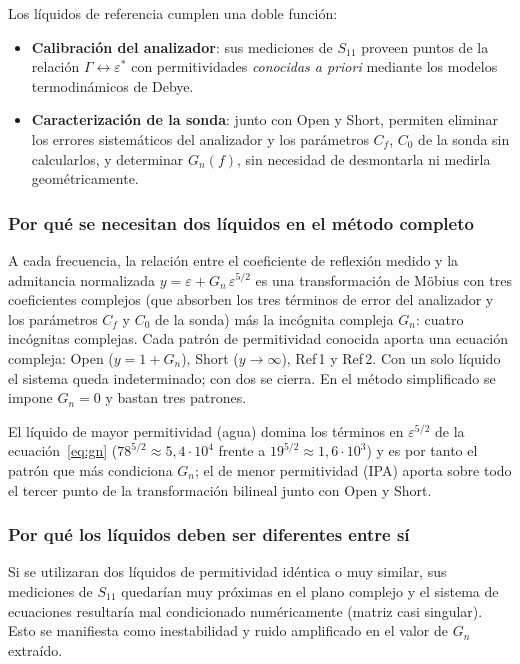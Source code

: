 Los líquidos de referencia cumplen una doble función:
\begin{itemize}
    \item \textbf{Calibración del analizador}: sus mediciones de $S_{11}$
          proveen puntos de la relación $\Gamma \leftrightarrow \varepsilon^*$
          con permitividades \emph{conocidas a priori} mediante los modelos
          termodinámicos de Debye.
    \item \textbf{Caracterización de la sonda}: junto con Open y Short, permiten
          eliminar los errores sistemáticos del analizador y los parámetros
          $C_f$, $C_0$ de la sonda sin calcularlos, y determinar $G_n(f)$, sin
          necesidad de desmontarla ni medirla geométricamente.
\end{itemize}

\subsubsection{Por qué se necesitan dos líquidos en el método completo}

A cada frecuencia, la relación entre el coeficiente de reflexión medido y la
admitancia normalizada $y = \varepsilon + G_n\,\varepsilon^{5/2}$ es una
transformación de Möbius con tres coeficientes complejos (que absorben los tres
términos de error del analizador y los parámetros $C_f$ y $C_0$ de la sonda) más
la incógnita compleja $G_n$: cuatro incógnitas complejas. Cada patrón de
permitividad conocida aporta una ecuación compleja: Open ($y = 1 + G_n$), Short
($y \to \infty$), Ref\,1 y Ref\,2. Con un solo líquido el sistema queda
indeterminado; con dos se cierra. En el método simplificado se impone $G_n = 0$
y bastan tres patrones.

El líquido de mayor permitividad (agua) domina los términos en $\varepsilon^{5/2}$
de la ecuación~\eqref{eq:gn} ($78^{5/2} \approx 5{,}4 \cdot 10^4$ frente a
$19^{5/2} \approx 1{,}6 \cdot 10^3$) y es por tanto el patrón que más condiciona
$G_n$; el de menor permitividad (IPA) aporta sobre todo el tercer punto de la
transformación bilineal junto con Open y Short.

\subsubsection{Por qué los líquidos deben ser diferentes entre sí}

Si se utilizaran dos líquidos de permitividad idéntica o muy similar,
sus mediciones de $S_{11}$ quedarían muy próximas en el plano complejo
y el sistema de ecuaciones resultaría mal condicionado numéricamente
(matriz casi singular). Esto se manifiesta como inestabilidad y ruido
amplificado en el valor de $G_n$ extraído.


